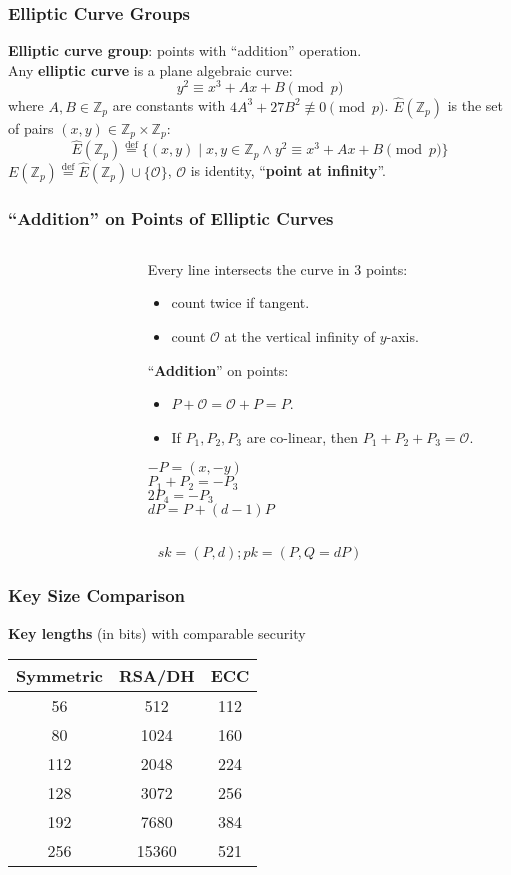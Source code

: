 \begin{frame}\frametitle{Elliptic Curve Groups}
\textbf{Elliptic curve group}: points with ``addition'' operation.\\
Any \textbf{elliptic curve} is a plane algebraic curve:
\[ y^2 \equiv x^3 + Ax + B \pmod p\]
where $A,B \in \mathbb{Z}_p$ are constants with $4A^3 + 27B^2\not \equiv 0 \pmod p$.
$\hat{E}(\mathbb{Z}_p)$ is the set of pairs $(x,y) \in \mathbb{Z}_p \times \mathbb{Z}_p$:
\[ \hat{E}(\mathbb{Z}_p) \overset{\text{def}}{=} \{(x,y) \mid x,y\in \mathbb{Z}_p \land y^2 \equiv x^3 + Ax + B \pmod p \}\]
$E(\mathbb{Z}_p) \overset{\text{def}}{=} \hat{E}(\mathbb{Z}_p)\cup \{\mathcal{O}\}$, $\mathcal{O}$ is identity, ``\textbf{point at infinity}''.
\end{frame}
\begin{frame}\frametitle{``Addition'' on Points of Elliptic Curves}
\begin{columns}
\begin{column}{5cm}
\begin{figure}
\begin{center}

\end{center}
\end{figure}
\end{column}
\begin{column}{5cm}
Every line intersects the curve in 3 points:
\begin{itemize}
\item count twice if tangent.
\item count $\mathcal{O}$ at the vertical infinity of $y$-axis.
\end{itemize}
``\textbf{Addition}'' on points:
\begin{itemize}
\item $P+\mathcal{O} = \mathcal{O} + P = P$.
\item If $P_1, P_2, P_3$ are co-linear, then $P_1 + P_2 + P_3 = \mathcal{O}$.
\end{itemize}
$-P=(x,-y)$\\
$P_1 + P_2 = -P_3$\\
$2P_4=-P_3$\\
$dP = P + (d-1)P$
\end{column}
\end{columns}
\[sk = (P,d); pk = (P,Q=dP)\]
\end{frame}
\begin{frame}\frametitle{Key Size Comparison}
\begin{center}
\textbf{Key lengths} (in bits) with comparable security
\newline

\begin{tabular}{|c|c|c|} \hline
Symmetric & RSA/DH & ECC \\ \hline	
56 & 512 & 112 \\
80 & 1024 & 160 \\
112 & 2048 & 224 \\
128 & 3072 & 256 \\
192 & 7680 & 384 \\
256 & 15360 & 521 \\ \hline	
\end{tabular}	
\end{center}
\end{frame}
